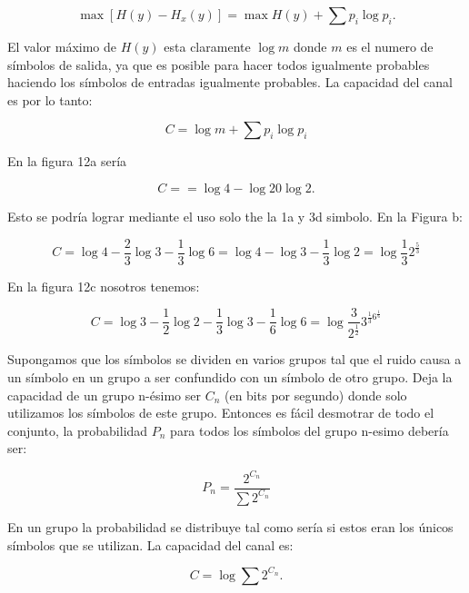 \begin{equation}
  \max [H(y) - H_x(y)] = \max H(y) + \sum p_i \log{p_i}.
\end{equation}
  
El valor m\'aximo de $H(y)$ esta claramente  $\log{m}$ donde $m$ es el numero de s\'imbolos de salida, ya que es posible para hacer 
todos igualmente probables haciendo los s\'imbolos de entradas igualmente probables. La capacidad del canal es por lo tanto:

\begin{equation}
  C = \log{m} + \sum p_i \log{p_i}
\end{equation}

En la figura 12a ser\'ia 

\begin{equation}
  C = = \log{4} - \log{2} 0 \log{2}.
\end{equation}

Esto se podr\'ia lograr mediante el uso solo the la 1a y 3d simbolo. En la Figura b:

\begin{equation}
  C = \log{4} - \frac{2}{3}\log{3} - \frac{1}{3}\log{6}
  = \log{4} - \log{3} - \frac{1}{3}\log{2}
  = \log{\frac{1}{3}} 2^{\frac{5}{3}}
\end{equation}

En la figura 12c nosotros tenemos:

\begin{equation}
  C = \log{3} - \frac{1}{2}\log{2} - \frac{1}{3}\log{3} - \frac{1}{6} \log{6}
  = \log  {\frac{3}{ 2^{\frac{1}{2}}}} 3^{\frac{1}{3} 6^{\frac{1}{6} }}
\end{equation}

Supongamos que los s\'imbolos se dividen en varios grupos tal que el ruido causa a un s\'imbolo en un grupo a 
ser confundido con un s\'imbolo de otro grupo. Deja la capacidad de un grupo n-\'esimo ser $C_n$ (en bits por segundo)
donde solo utilizamos los s\'imbolos de este grupo. Entonces es f\'acil desmotrar  de todo el conjunto, 
la probabilidad $P_n$ para todos los s\'imbolos del grupo n-esimo deber\'ia ser:

\begin{equation}
  P_n = \frac{2^{C_n}}{\sum 2^{C_n}}
\end{equation}

En un grupo la probabilidad se distribuye tal como ser\'ia si estos eran los \'unicos s\'imbolos que se utilizan. 
La capacidad del canal es:

\begin{equation}
  C = \log{\sum 2^{C_n}}.
\end{equation}

